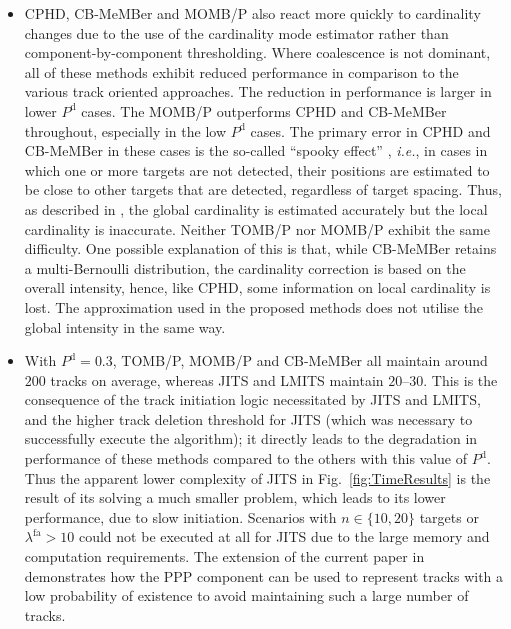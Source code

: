 \documentclass[journal,twoside]{IEEEtran}
\theoremstyle{plain}
\begin{document}
\begin{itemize}
\item CPHD, CB-MeMBer and MOMB/P also react more quickly to cardinality changes due to the use of the cardinality mode estimator rather than component-by-component thresholding. Where coalescence is not dominant, all of these methods exhibit reduced performance in comparison to the various track oriented approaches. The reduction in performance is larger in lower $P^{\mathrm{d}}$ cases. The MOMB/P outperforms CPHD and CB-MeMBer throughout, especially in the low $P^{\mathrm{d}}$ cases. The primary error in CPHD and CB-MeMBer in these cases is the so-called ``spooky effect'' \cite{FraSch09}, \textit{i.e.}\xspace, in cases in which one or more targets are not detected, their positions are estimated to be close to other targets that are detected, regardless of target spacing. Thus, as described in \cite{FraSch09}, the global cardinality is estimated accurately but the local cardinality is inaccurate. Neither TOMB/P nor MOMB/P exhibit the same difficulty. One possible explanation of this is that, while CB-MeMBer retains a multi-Bernoulli distribution, the cardinality correction is based on the overall intensity, hence, like CPHD, some information on local cardinality is lost. The approximation used in the proposed methods does not utilise the global intensity in the same way.

\item With $P^{\mathrm{d}}=0.3$, TOMB/P, MOMB/P and CB-MeMBer all maintain around $200$ tracks on average, whereas JITS and LMITS maintain $20$--$30$. This is the consequence of the track initiation logic necessitated by JITS and LMITS, and the higher track deletion threshold for JITS (which was necessary to successfully execute the algorithm); it directly leads to the degradation in performance of these methods compared to the others with this value of $P^{\mathrm{d}}$. Thus the apparent lower complexity of JITS in Fig.~\ref{fig:TimeResults} is the result of its solving a much smaller problem, which leads to its lower performance, due to slow initiation. Scenarios with $n\in\{10,20\}$ targets or $\lambda^\mathrm{fa}>10$ could not be executed at all for JITS due to the large memory and computation requirements. The extension of the current paper in \cite{Wil12F2} demonstrates how the PPP component can be used to represent tracks with a low probability of existence to avoid maintaining such a large number of tracks.
\end{itemize}
\end{document}
